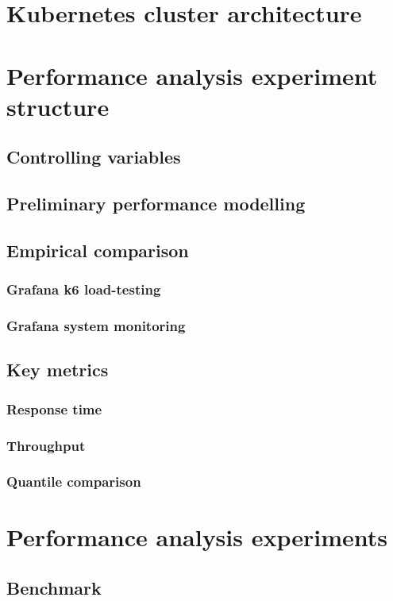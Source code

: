 \section{Kubernetes cluster architecture}

\section{Performance analysis experiment structure}
\subsection{Controlling variables}
\subsection{Preliminary performance modelling}
\subsection{Empirical comparison}
\subsubsection{Grafana k6 load-testing}
\subsubsection{Grafana system monitoring}
\subsection{Key metrics}
\subsubsection{Response time}
\subsubsection{Throughput}
\subsubsection{Quantile comparison}

\section{Performance analysis experiments}
\subsection{Benchmark}
